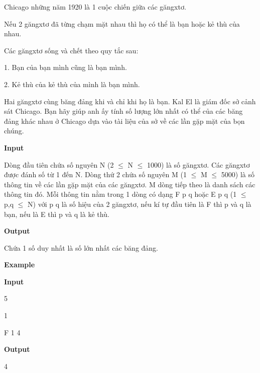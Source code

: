 



    Chicago những năm 1920 là 1 cuộc chiến giữa các găngxtơ.   

      Nếu 2 găngxtơ đã từng chạm mặt nhau thì họ có thể là bạn hoặc kẻ thù của nhau.     

      Các găngxtơ sống và chết theo quy tắc sau:     

      1. Bạn của bạn mình cũng là bạn mình.     

      2. Kẻ thù của kẻ thù của mình là bạn mình.     

      Hai găngxtơ cùng băng đảng khi và chỉ khi họ là bạn. Kal El là giám đốc sở cảnh sát Chicago. Bạn hãy giúp anh ấy tính số lượng lớn nhất có thể của các băng đảng khác nhau ở Chicago dựa vào tài liệu của sở về các lần gặp mặt của bọn chúng.     

\textbf{       Input      }

      Dòng đầu tiên chứa số nguyên N (2 $\le$ N $\le$ 1000) là số găngxtơ. Các găngxtơ được đánh số từ 1 đến N. Dòng thứ 2 chứa số nguyên M (1 $\le$ M $\le$ 5000) là số thông tin về các lần gặp mặt của các găngxtơ. M dòng tiếp theo là danh sách các thông tin đó. Mỗi thông tin nằm trong 1 dòng có dạng F p q hoặc E p q (1 $\le$ p,q $\le$ N) với p q là số hiệu của 2 găngxtơ, nếu kí tự đầu tiên là F thì p và q là bạn, nếu là E thì p và q là kẻ thù.     

\textbf{       Output      }

      Chứa 1 số duy nhất là số lớn nhất các băng đảng.     

\textbf{       Example      }

\textbf{       Input      }

      5     

      1     

      F 1 4     

\textbf{       Output      }

      4      



